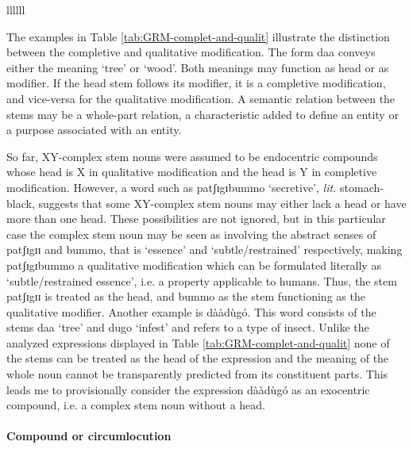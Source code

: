 \begin{exe}
\begin{exe}
\begin{exe}
{\begin{exe}
\begin{exe}
\begin{exe}
\begin{exe}
\begin{table}[htb!]
\begin{Itabular}{llllll}
\lspbottomrule
\end{Itabular} 
\end{table} 


The examples in Table \ref{tab:GRM-complet-and-qualit} illustrate the
distinction between the completive and qualitative modification. The form {\sls 
daa}  conveys either the meaning `tree' or `wood'. Both meanings may function as
head or as modifier.  If the head stem follows its modifier, it is a completive
modification, and vice-versa for the qualitative modification. A semantic
relation between the stems may  be a whole-part relation, a characteristic added
to define an entity or a purpose  associated with an entity. 

So far,   XY-complex stem nouns were assumed to be  endocentric compounds whose
head is X in qualitative modification and the head is Y in completive
modification.  However, a word such as {\sls patʃɪgɪbummo} `secretive', {\it 
lit.}
stomach-black, suggests that some XY-complex stem nouns may  either lack a head
or have more than one head. These possibilities are not ignored, but in this
particular case the complex stem noun may be seen as involving  the abstract
senses of {\sls patʃɪgɪɪ} and {\sls bummo}, that is  `essence' and 
`subtle/restrained' respectively, making {\sls patʃɪgɪbummo} a qualitative
modification  which can be formulated literally as `subtle/restrained essence',
i.e.   a property applicable to humans. Thus, the stem {\sls patʃɪgɪɪ} is 
treated
as the head, and {\sls bummo} as the stem functioning as the qualitative 
modifier.
Another example is {\sls dààdùgó}. This word consists of the stems {\sls 
daa}
`tree' and  {\sls dugo} `infest'   and refers to a type   of insect. Unlike the
analyzed expressions displayed in  Table \ref{tab:GRM-complet-and-qualit}  none
of the stems can be treated as the head of the expression and the meaning of the
whole noun cannot be transparently  predicted from its constituent parts. This
leads me to provisionally consider the expression {\sls dààdùgó}  as an
exocentric compound, i.e. a complex stem noun without a head.


 
\paragraph{Compound or circumlocution}
\label{sec:GRM-comp-vs-circum}


\end{exe}
\end{exe}
\end{exe}
\end{exe}}
\end{exe}
\end{exe}
\end{exe}
